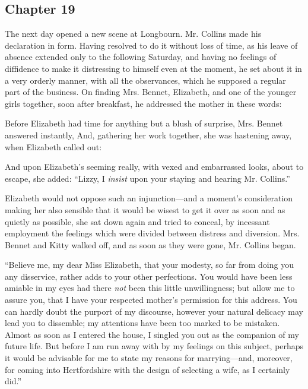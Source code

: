 \subsection[chapter-19]{\useURL[url19][][][]\from[url19] Chapter 19}

The next day opened a new scene at Longbourn. Mr. Collins made his declaration in form. Having resolved to do it without loss of time, as his leave of absence extended only to the following Saturday, and having no feelings of diffidence to make it distressing to himself even at the moment, he set about it in a very orderly manner, with all the observances, which he supposed a regular part of the business. On finding Mrs. Bennet, Elizabeth, and one of the younger girls together, soon after breakfast, he addressed the mother in these words:


Before Elizabeth had time for anything but a blush of surprise, Mrs. Bennet answered instantly,  And, gathering her work together, she was hastening away, when Elizabeth called out:


 And upon Elizabeth's seeming really, with vexed and embarrassed looks, about to escape, she added: “Lizzy, I {\em insist} upon your staying and hearing Mr. Collins.”

Elizabeth would not oppose such an injunction---and a moment's consideration making her also sensible that it would be wisest to get it over as soon and as quietly as possible, she sat down again and tried to conceal, by incessant employment the feelings which were divided between distress and diversion. Mrs. Bennet and Kitty walked off, and as soon as they were gone, Mr. Collins began.

“Believe me, my dear Miss Elizabeth, that your modesty, so far from doing you any disservice, rather adds to your other perfections. You would have been less amiable in my eyes had there {\em not} been this little unwillingness; but allow me to assure you, that I have your respected mother's permission for this address. You can hardly doubt the purport of my discourse, however your natural delicacy may lead you to dissemble; my attentions have been too marked to be mistaken. Almost as soon as I entered the house, I singled you out as the companion of my future life. But before I am run away with by my feelings on this subject, perhaps it would be advisable for me to state my reasons for marrying---and, moreover, for coming into Hertfordshire with the design of selecting a wife, as I certainly did.”


